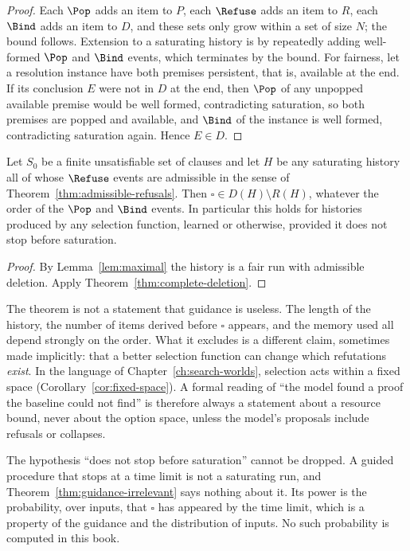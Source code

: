 \begin{proof}
Each $\Pop$ adds an item to $P$, each $\Refuse$ adds an item to $R$, each $\Bind$ adds an item to $D$, and these sets only grow within a set of size $N$; the bound follows. Extension to a saturating history is by repeatedly adding well-formed $\Pop$ and $\Bind$ events, which terminates by the bound. For fairness, let a resolution instance have both premises persistent, that is, available at the end. If its conclusion $E$ were not in $D$ at the end, then $\Pop$ of any unpopped available premise would be well formed, contradicting saturation, so both premises are popped and available, and $\Bind$ of the instance is well formed, contradicting saturation again. Hence $E\in D$.
\end{proof}

\begin{theorem}
\label{thm:guidance-irrelevant}
Let $S_0$ be a finite unsatisfiable set of clauses and let $H$ be any saturating history all of whose $\Refuse$ events are admissible in the sense of Theorem~\ref{thm:admissible-refusals}. Then $\square\in D(H)\setminus R(H)$, whatever the order of the $\Pop$ and $\Bind$ events. In particular this holds for histories produced by any selection function, learned or otherwise, provided it does not stop before saturation.
\end{theorem}

\begin{proof}
By Lemma~\ref{lem:maximal} the history is a fair run with admissible deletion. Apply Theorem~\ref{thm:complete-deletion}.
\end{proof}

The theorem is not a statement that guidance is useless. The length of the history, the number of items derived before $\square$ appears, and the memory used all depend strongly on the order. What it excludes is a different claim, sometimes made implicitly: that a better selection function can change which refutations \emph{exist}. In the language of Chapter~\ref{ch:search-worlds}, selection acts within a fixed space (Corollary~\ref{cor:fixed-space}). A formal reading of ``the model found a proof the baseline could not find'' is therefore always a statement about a resource bound, never about the option space, unless the model's proposals include refusals or collapses.

\begin{remark}
The hypothesis ``does not stop before saturation'' cannot be dropped. A guided procedure that stops at a time limit is not a saturating run, and Theorem~\ref{thm:guidance-irrelevant} says nothing about it. Its power is the probability, over inputs, that $\square$ has appeared by the time limit, which is a property of the guidance and the distribution of inputs. No such probability is computed in this book.
\end{remark}

